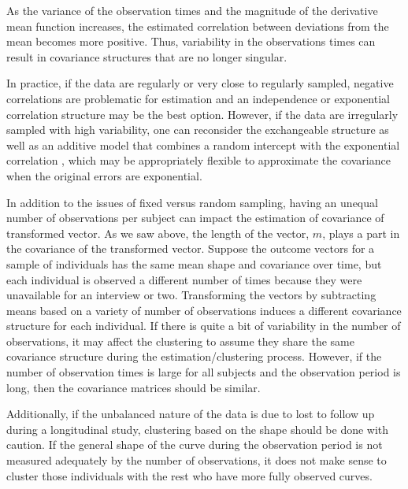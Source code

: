 As the variance of the observation times and the magnitude of the derivative mean function increases, the estimated correlation between deviations from the mean becomes more positive. Thus, variability in the observations times can result in covariance structures that are no longer singular. 

In practice, if the data are regularly or very close to regularly sampled, negative correlations are problematic for estimation and an independence or exponential correlation structure may be the best option. However, if the data are irregularly sampled with high variability, one can reconsider the exchangeable structure as well as an additive model that combines a random intercept with the exponential correlation \cite{diggle2002}, which may be appropriately flexible to approximate the covariance when the original errors are exponential.

In addition to the issues of fixed versus random sampling, having an unequal number of observations per subject can impact the estimation of covariance of transformed vector. As we saw above, the length of the vector, $m$, plays a part in the covariance of the transformed vector. Suppose the outcome vectors for a sample of individuals has the same mean shape and covariance over time, but each individual is observed a different number of times because they were unavailable for an interview or two. Transforming the vectors by subtracting means based on a variety of number of observations induces a different covariance structure for each individual. If there is quite a bit of variability in the number of observations, it may affect the clustering to assume they share the same covariance structure during the estimation/clustering process. However, if the number of observation times is large for all subjects and the observation period is long, then the covariance matrices should be similar. 

Additionally, if the unbalanced nature of the data is due to lost to follow up during a longitudinal study, clustering based on the shape should be done with caution. If the general shape of the curve during the observation period is not measured adequately by the number of observations, it does not make sense to cluster those individuals with the rest who have more fully observed curves. 

